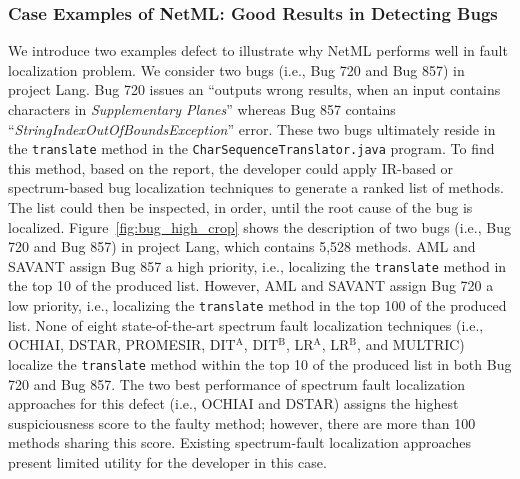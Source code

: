 \subsubsection{Case Examples of NetML: Good Results in Detecting Bugs}
\label{sec:case_good}
We introduce two examples defect to illustrate why NetML performs well in fault localization problem. We consider two bugs (i.e., Bug 720 and Bug 857) in project Lang. Bug 720 issues an ``outputs wrong results, when an input contains characters in \textit{Supplementary Planes}'' whereas Bug 857 contains ``\textit{StringIndexOutOfBoundsException}'' error. These two bugs ultimately reside in the \texttt{translate} method in the \texttt{CharSequenceTranslator.java} program. To find this method, based on the report, the developer could apply IR-based or spectrum-based bug localization techniques to generate a ranked list of methods. The list could then be inspected, in order, until the root cause of the bug is localized. Figure~\ref{fig:bug_high_crop} shows the description of two bugs (i.e., Bug 720 and Bug 857) in project Lang, which contains 5,528 methods. AML and SAVANT assign Bug 857 a high priority, i.e., localizing the \texttt{translate} method in the top 10 of the produced list. However, AML and SAVANT assign Bug 720 a low priority, i.e., localizing the \texttt{translate} method in the top 100 of the produced list. None of eight state-of-the-art spectrum fault localization techniques (i.e., OCHIAI, DSTAR, PROMESIR, DIT$^\text{A}$, DIT$^\text{B}$, LR$^\text{A}$, LR$^\text{B}$, and MULTRIC) localize the \texttt{translate} method within the top 10 of the produced list in both Bug 720 and Bug 857. The two best performance of spectrum fault localization approaches for this defect (i.e., OCHIAI and DSTAR) assigns the highest suspiciousness score to the faulty method; however, there are more than 100 methods sharing this score. Existing spectrum-fault localization approaches present limited utility for the developer in this case. 

